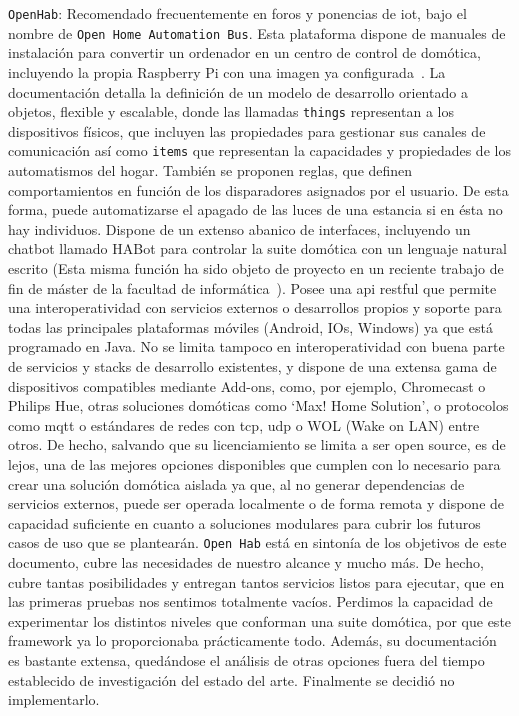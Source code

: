 \vspace{1cm}

\verb|OpenHab|: Recomendado frecuentemente en foros y ponencias de \gls{iot}, bajo el nombre de \verb|Open Home Automation Bus|. Esta plataforma dispone de manuales de instalación para convertir un ordenador en un centro de control de domótica, incluyendo la propia Raspberry Pi con una imagen ya configurada~\cite{openHabRaspberryPi}. La documentación detalla la definición de un modelo de desarrollo orientado a objetos, flexible y escalable, donde las llamadas \verb|things| representan a los dispositivos físicos, que incluyen las propiedades para gestionar sus canales de comunicación así como \verb|items| que representan la capacidades y propiedades de los automatismos del hogar. También se proponen reglas, que definen comportamientos en función de los disparadores asignados por el usuario. De esta forma, puede automatizarse el apagado de las luces de una estancia si en ésta no hay individuos. Dispone de un extenso abanico de interfaces, incluyendo un chatbot llamado HABot para controlar la suite domótica con un lenguaje natural escrito (Esta misma función ha sido objeto de proyecto en un reciente trabajo de fin de máster de la facultad de informática~\cite{brun2018smart}). Posee una \gls{api} restful que permite una interoperatividad con servicios externos o desarrollos propios y soporte para todas las principales plataformas móviles (Android, IOs, Windows) ya que está programado en Java. No se limita tampoco en interoperatividad con buena parte de servicios y stacks de desarrollo existentes, y dispone de una extensa gama de dispositivos compatibles mediante Add-ons, como, por ejemplo, Chromecast o Philips Hue, otras soluciones domóticas como ‘Max! Home Solution’, o protocolos como \gls{mqtt} o estándares de redes con \gls{tcp}, \gls{udp} o WOL (Wake on LAN) entre otros. De hecho, salvando que su licenciamiento se limita a ser open source, es de lejos, una de las mejores opciones disponibles que cumplen con lo necesario para crear una solución domótica aislada ya que, al no generar dependencias de servicios externos, puede ser operada localmente o de forma remota y dispone de capacidad suficiente en cuanto a soluciones modulares para cubrir los futuros casos de uso que se plantearán. \verb|Open Hab| está en sintonía de los objetivos de este documento, cubre las necesidades de nuestro alcance y mucho más. De hecho, cubre tantas posibilidades y entregan tantos servicios listos para ejecutar, que en las primeras pruebas nos sentimos totalmente vacíos. Perdimos la capacidad de experimentar los distintos niveles que conforman una suite domótica, por que este \gls{framework} ya lo proporcionaba prácticamente todo. Además, su documentación es bastante extensa, quedándose el análisis de otras opciones fuera del tiempo establecido de investigación del estado del arte. Finalmente se decidió no implementarlo.

